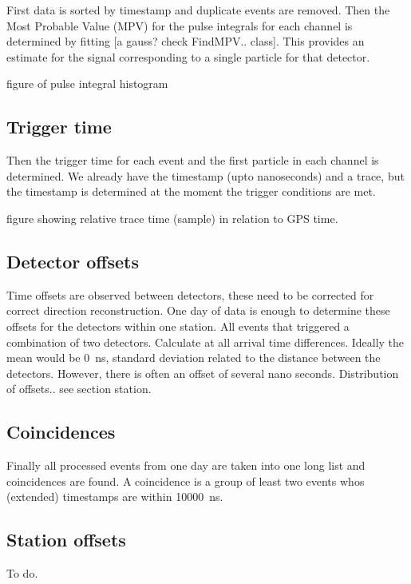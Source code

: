 First data is sorted by timestamp and duplicate events are removed. Then the Most Probable Value (MPV) for the pulse integrals for each channel is determined by fitting [a gauss? check FindMPV.. class]. This provides an estimate for the signal corresponding to a single particle for that detector.

figure of pulse integral histogram


\subsection{Trigger time}

Then the trigger time for each event and the first particle in each channel is determined. We already have the \gps timestamp (upto nanoseconds) and a trace, but the timestamp is determined at the moment the trigger conditions are met.

figure showing  relative trace time (sample)  in relation to GPS time.


\subsection{Detector offsets}

Time offsets are observed between detectors, these need to be corrected for correct direction reconstruction. One day of data is enough to determine these offsets for the detectors within one station. All events that triggered a combination of two detectors. Calculate at all arrival time differences. Ideally the mean would be \SI{0}{\ns}, standard deviation related to the distance between the detectors. However, there is often an offset of several nano seconds. Distribution of offsets.. see section station.


\subsection{Coincidences}

Finally all processed events from one day are taken into one long list and coincidences are found. A coincidence is a group of least two events whos (extended) timestamps are within \SI{10000}{\ns}.


\subsection{Station offsets}

To do.
